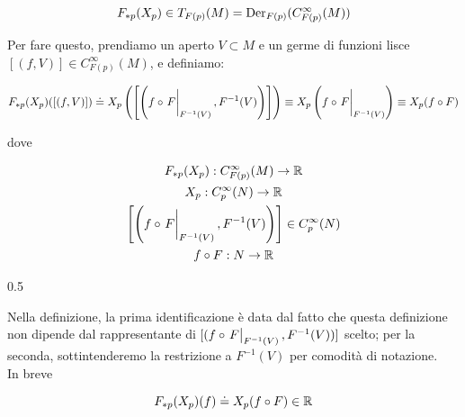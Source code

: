 \begin{equation}
	F_{*p}(X_{p}) \in T_{F(p)}(M) = \operatorname{Der}_{F(p)}(C_{F(p)}^{\infty}(M))
\end{equation}

Per fare questo, prendiamo un aperto $ V \subset M $ e un germe di funzioni lisce $ [(f,V)] \in C_{F(p)}^{\infty}(M) $, e definiamo:

\begin{equation}
	F_{*p}(X_{p})([(f,V)]) \doteq X_{p} \left( \left[ \left( f \circ \eval{F}_{F^{-1}(V)}, F^{-1}(V) \right) \right] \right) %
	\equiv X_{p} \left( f \circ \eval{F}_{F^{-1}(V)} \right) %
	\equiv X_{p}(f \circ F)
\end{equation}

dove

\begin{gather}
	F_{*p}(X_{p}) : C_{F(p)}^{\infty}(M) \to \R \\
	X_{p} : C_{p}^{\infty}(N) \to \R \\
	\left[ \left( f \circ \eval{F}_{F^{-1}(V)}, F^{-1}(V) \right) \right] \in C_{p}^{\infty}(N) \\
	f \circ F : N \to \R
\end{gather}

	{0.5}{%
			}

Nella definizione, la prima identificazione è data dal fatto che questa definizione non dipende dal rappresentante di $ [(f \circ \eval{F}_{F^{-1}(V)}, F^{-1}(V))] $ scelto; per la seconda, sottintenderemo la restrizione a $ F^{-1}(V) $ per comodità di notazione. \\
In breve

\begin{equation}
	F_{*p}(X_{p})(f) \doteq X_{p}(f \circ F) \in \mathbb{R}
\end{equation}

